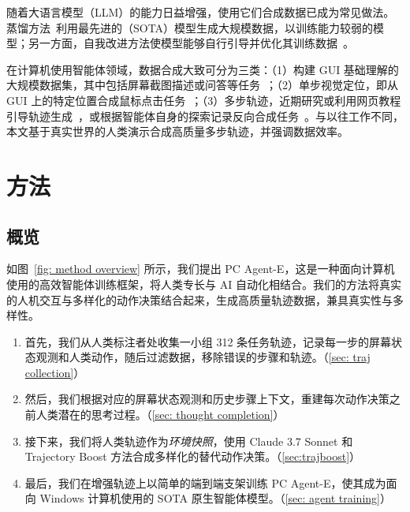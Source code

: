 \documentclass[10pt]{article}
\renewcommand{\cite}{\citep}
\begin{document}
随着大语言模型（LLM）的能力日益增强，使用它们合成数据已成为常见做法。蒸馏方法~\cite{taori2023alpaca,gunasekar2023textbooksneed,xu2023wizardlmempoweringlargelanguage}利用最先进的（SOTA）模型生成大规模数据，以训练能力较弱的模型；另一方面，自我改进方法使模型能够自行引导并优化其训练数据~\cite{wang2023selfinstructaligninglanguagemodels2}。

在计算机使用智能体领域，数据合成大致可分为三类：（1）构建 GUI 基础理解的大规模数据集，其中包括屏幕截图描述或问答等任务~\cite{liu2024harnessingwebpageuistextrich,uitars2025}；（2）单步视觉定位，即从 GUI 上的特定位置合成鼠标点击任务~\cite{gou2025navigatingdigitalworldhumans,wu2024osatlasfoundationactionmodel}；（3）多步轨迹，近期研究或利用网页教程引导轨迹生成~\cite{ou2024synatraturningindirectknowledge,xu2025agenttrekagenttrajectorysynthesis}，或根据智能体自身的探索记录反向合成任务~\cite{sun2025osgenesisautomatingguiagent,murty2024nnetscape}。与以往工作不同，本文基于真实世界的人类演示合成高质量多步轨迹，并强调数据效率。

\section{方法}

\subsection{概览}

如图~\ref{fig: method overview} 所示，我们提出 PC Agent-E，这是一种面向计算机使用的高效智能体训练框架，将人类专长与 AI 自动化相结合。我们的方法将真实的人机交互与多样化的动作决策结合起来，生成高质量轨迹数据，兼具真实性与多样性。

\begin{enumerate}
    \item 首先，我们从人类标注者处收集一小组 312 条任务轨迹，记录每一步的屏幕状态观测和人类动作，随后过滤数据，移除错误的步骤和轨迹。（\autoref{sec: traj collection}）
    \item 然后，我们根据对应的屏幕状态观测和历史步骤上下文，重建每次动作决策之前人类潜在的思考过程。（\autoref{sec: thought completion}）
    \item 接下来，我们将人类轨迹作为\textit{环境快照}，使用 Claude 3.7 Sonnet 和 Trajectory Boost 方法合成多样化的替代动作决策。（\autoref{sec:trajboost}）
    \item 最后，我们在增强轨迹上以简单的端到端支架训练 PC Agent-E，使其成为面向 Windows 计算机使用的 SOTA 原生智能体模型。（\autoref{sec: agent training}）
\end{enumerate}
\end{document}
